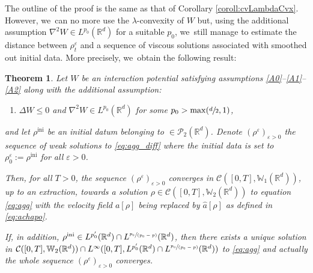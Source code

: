 \documentclass[11pt]{article}
\numberwithin{equation}{section}
\newcommand{\spfrac}[2]{\sfrac{#1}{(#2)}}
\newcommand{\ini}{\mathrm{ini}}
\def\RR{\mathbb{R}}
\def\WW{\mathbb{W}}
\def\eps{\varepsilon}
\def\calC{{\mathcal C}}
\def\calP{{\mathcal P}}
\def\achapo{\widehat{a}}
\theoremstyle{plain}
\newtheorem{theorem}{Theorem}[section]
\theoremstyle{definition}
\begin{document}
The outline of the proof is the same as that of Corollary \ref{coroll:cvLambdaCvx}. However, we~can no more use the $\lambda$-convexity of $W$ but, using the additional assumption $\nabla^2 W \in L^{p_0}(\RR^d)$ for a suitable $p_0$, we~still manage to estimate the distance between $\rho_t^\eps$ and a sequence of viscous solutions associated with smoothed out initial data. More precisely, we~obtain the following result:
\begin{theorem}\label{thm:cvRepulsive}
Let $W$ be an interaction potential satisfying assumptions \eqref{A0}--\eqref{A1}--\eqref{A2} along with the additional assumption:
\begin{enumerate}\renewcommand{\theenumi}{\textup{A}\arabic{enumi}}\setcounter{enumi}{4}
\item
\label{A5} $\Delta W \leq 0$ and $\nabla^2 W \in L^{p_0}(\RR^d)$ for some $p_0 > \max(\sfrac d2, 1)$,
\end{enumerate}
and let $\rho^{\ini}$ be an initial datum belonging to $ \in \calP_2(\RR^d)$.
Denote $(\rho^\eps)_{\eps > 0}$ the sequence of weak solutions to \eqref{eq:agg_diff} where the initial data is set to $\rho_0^\eps := \rho^{\ini}$ for all $\eps > 0$.

Then, for all $T>0$, the sequence $(\rho^\eps)_{\eps > 0}$ converges in $\calC([0,T], \WW_1(\RR^d))$, up to an extraction, towards a solution $\rho \in \calC([0,T], \WW _2(\RR^d))$ to equation \eqref{eq:agg} with the velocity field $a[\rho]$ being replaced by $\achapo[\rho]$ as defined in \eqref{eq:achapo}.

If, in addition, $\rho^{\ini} \in L^{p_0'}(\RR^d) \cap L^{\spfrac{p_0}{p_0-p}}(\RR^d)$, then there exists a unique solution in $\calC([0,T], \WW_2(\RR^d)) \cap L^\infty([0,T], L^{p_0'}(\RR^d) \cap L^{\spfrac{p_0}{p_0-p}}(\RR^d))$ to \eqref{eq:agg} and actually the whole sequence $(\rho^\eps)_{\eps > 0}$ converges.
\end{theorem}
\end{document}
